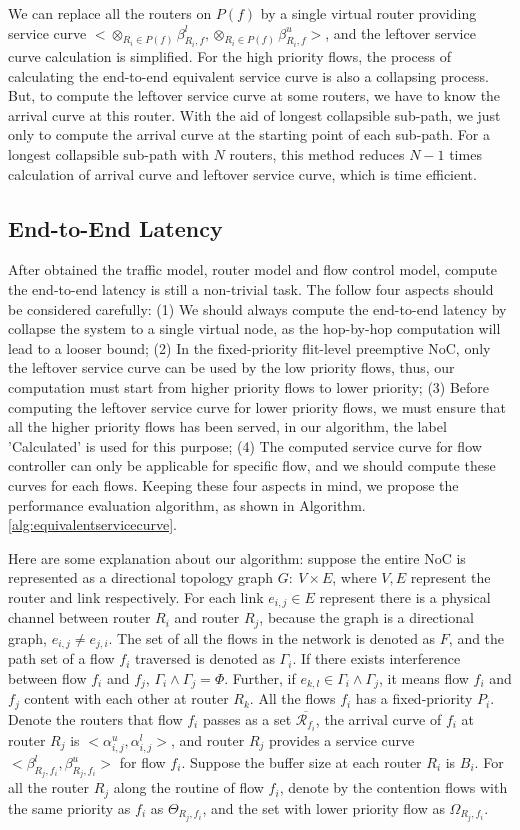 \documentclass[10pt,journal]{IEEEtran}
\begin{document}
We can replace all the routers on $P(f)$ by a single virtual router providing service curve $<\otimes_{R_i\in P(f)}\beta_{R_i,f}^l,\otimes_{R_i\in P(f)}\beta_{R_i,f}^u>$, and the leftover service curve calculation is simplified. For the high priority flows, the process of calculating the end-to-end equivalent service curve is also a collapsing process. But, to compute the leftover service curve at some routers, we have to know the arrival curve at this router. With the aid of longest collapsible sub-path, we just only to compute the arrival curve at the starting point of each sub-path. For a longest collapsible sub-path with $N$ routers, this method reduces $N-1$ times calculation of arrival curve and leftover service curve, which is time efficient.

\subsection{End-to-End Latency}
After obtained the traffic model, router model and flow control model, compute the end-to-end latency is still a non-trivial task. The follow four aspects should be considered carefully: (1) We should always compute the end-to-end latency by collapse the system to a single virtual node, as the hop-by-hop computation will lead to a looser bound; (2) In the fixed-priority flit-level preemptive NoC, only the leftover service curve can be used by the low priority flows, thus, our computation must start from higher priority flows to lower priority; (3) Before computing the leftover service curve for lower priority flows, we must ensure that all the higher priority flows has been served, in our algorithm, the label 'Calculated' is used for this purpose; (4) The computed service curve for flow controller can only be applicable for specific flow, and we should compute these curves for each flows. Keeping these four aspects in mind, we propose the performance evaluation algorithm, as shown in Algorithm. \ref{alg:equivalentservicecurve}.

Here are some explanation about our algorithm: suppose the entire NoC is represented as a directional topology graph $G:\ V\times E$, where $V,E$ represent the router and link respectively. For each link $e_{i,j}\in E$ represent there is a physical channel between router $R_i$ and router $R_j$, because the graph is a directional graph, $e_{i,j}\neq e_{j,i}$. The set of all the flows in the network is denoted as $F$, and the path set of a flow $f_i$ traversed is denoted as $\Gamma_i$. If there exists interference between flow $f_i$ and $f_j$, $\Gamma_i\wedge\Gamma_j=\Phi$. Further, if $e_{k,l}\in\Gamma_i\wedge\Gamma_j$, it means flow $f_i$ and $f_j$ content with each other at router $R_k$. All the flows $f_i$ has a fixed-priority $P_i$. Denote the routers that flow $f_i$ passes as a set $\overline{\mathcal{R}_{f_i}}$, the arrival curve of $f_i$ at router $R_j$ is $<\alpha_{i,j}^u,\alpha_{i,j}^l>$, and router $R_j$ provides a service curve $<\beta_{R_j,f_i}^l,\beta_{R_j,f_i}^u>$ for flow $f_i$. Suppose the buffer size at each router $R_i$ is $B_i$. For all the router $R_j$ along the routine of flow $f_i$, denote by the contention flows with the same priority as $f_i$ as $\Theta_{R_j,f_i}$, and the set with lower priority flow as $\Omega_{R_j,f_i}$.
\end{document}
